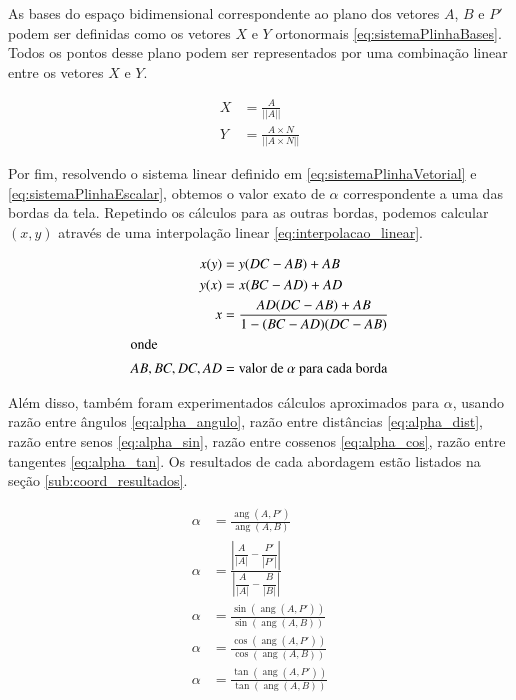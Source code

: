 \documentclass[brazil,pagestart=firstchapter]{abnt}
\DeclareMathOperator{\angulo}{ang}
\begin{document}
As bases do espaço bidimensional correspondente ao plano dos vetores $A$,
$B$ e $P'$ podem ser definidas como os vetores $X$ e $Y$ ortonormais
\eqref{eq:sistemaPlinhaBases}. Todos os pontos desse plano podem ser
representados por uma combinação linear entre os vetores $X$ e $Y$.


\begin{align}
\label{eq:sistemaPlinhaBases}
X & = \frac{A}{ || A || }                     \\
Y & = \frac{A \times N}{ || A \times N || }   \nonumber
\end{align}

Por fim, resolvendo o sistema linear definido em
\eqref{eq:sistemaPlinhaVetorial} e \eqref{eq:sistemaPlinhaEscalar}, obtemos
o valor exato de $\alpha$ correspondente a uma das bordas da tela. Repetindo
os cálculos para as outras bordas, podemos calcular $(x,y)$ através de uma
interpolação linear \eqref{eq:interpolacao_linear}.

\begin{align}
\label{eq:interpolacao_linear}
x(y) & = y (DC - AB) + AB  \\
y(x) & = x (BC - AD) + AD  \nonumber \\
x    & = \frac{AD  (DC - AB) + AB}{1 - (BC - AD)  (DC - AB)}  \nonumber \\
\intertext{onde}
AB, BC, DC, AD & = \text{valor de $\alpha$ para cada borda} \nonumber
\end{align}


Além disso, também foram experimentados cálculos aproximados para $\alpha$,
usando
razão entre ângulos \eqref{eq:alpha_angulo},
razão entre distâncias \eqref{eq:alpha_dist},
razão entre senos \eqref{eq:alpha_sin},
razão entre cossenos \eqref{eq:alpha_cos},
razão entre tangentes \eqref{eq:alpha_tan}.
Os resultados de cada abordagem estão listados na seção
\ref{sub:coord_resultados}.

\begin{align}
\label{eq:alpha_angulo}
\alpha & = \frac{\angulo(A, P')}{\angulo(A, B)} \\
\label{eq:alpha_dist}
\alpha & = \frac{
		\left| \dfrac{A}{|A|} - \dfrac{P'}{|P'|} \right|
	}{
		\left| \dfrac{A}{|A|} - \dfrac{B }{|B |} \right|
	}  \\
\label{eq:alpha_sin}
\alpha & = \frac{\sin(\angulo(A, P'))}{\sin(\angulo(A, B))} \\
\label{eq:alpha_cos}
\alpha & = \frac{\cos(\angulo(A, P'))}{\cos(\angulo(A, B))} \\
\label{eq:alpha_tan}
\alpha & = \frac{\tan(\angulo(A, P'))}{\tan(\angulo(A, B))}
\end{align}
\end{document}

